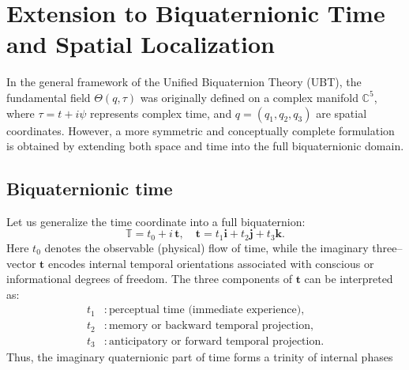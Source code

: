 \section{Extension to Biquaternionic Time and Spatial Localization}

In the general framework of the Unified Biquaternion Theory (UBT), the fundamental field
\(\Theta(q,\tau)\) was originally defined on a complex manifold \(\mathbb{C}^5\), where
\(\tau = t + i\psi\) represents complex time, and \(q=(q_1,q_2,q_3)\) are spatial coordinates.
However, a more symmetric and conceptually complete formulation is obtained by extending both
space and time into the full biquaternionic domain.

\subsection{Biquaternionic time}

Let us generalize the time coordinate into a full biquaternion:
\[
\mathbb{T} = t_0 + i\,\mathbf{t}, \quad 
\mathbf{t} = t_1\mathbf{i} + t_2\mathbf{j} + t_3\mathbf{k}.
\]
Here \(t_0\) denotes the observable (physical) flow of time, while the imaginary
three–vector \(\mathbf{t}\) encodes internal temporal orientations associated with
conscious or informational degrees of freedom.  
The three components of \(\mathbf{t}\) can be interpreted as:
\begin{align*}
t_1 &: \text{perceptual time (immediate experience)}, \\
t_2 &: \text{memory or backward temporal projection}, \\
t_3 &: \text{anticipatory or forward temporal projection}.
\end{align*}
Thus, the imaginary quaternionic part of time forms a trinity of internal phases


